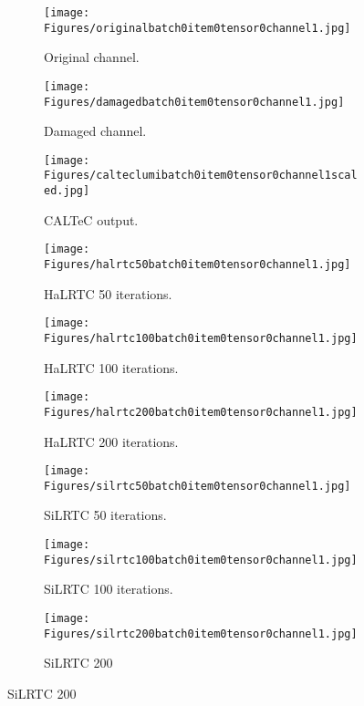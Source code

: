 \begin{figure}[H]
\centering
\begin{subfigure}{.32\linewidth}
	\centering
	\texttt{[image: Figures/originalbatch0item0tensor0channel1.jpg]}
	\caption{Original channel.}
\end{subfigure}%
\hfill
\begin{subfigure}{.32\textwidth}
	\centering
	\texttt{[image: Figures/damagedbatch0item0tensor0channel1.jpg]}
	\caption{Damaged channel.}
\end{subfigure}
\hfill 
%
\begin{subfigure}{.32\textwidth}
	\centering
	\texttt{[image: Figures/calteclumibatch0item0tensor0channel1scaled.jpg]}
	\caption{CALTeC output.}
\end{subfigure}

\begin{subfigure}{.32\textwidth}
	\centering
	\texttt{[image: Figures/halrtc50batch0item0tensor0channel1.jpg]}
	\caption{HaLRTC 50 iterations.}
\end{subfigure}
\hfill 
\begin{subfigure}{.32\textwidth}
	\centering
	\texttt{[image: Figures/halrtc100batch0item0tensor0channel1.jpg]}
	\caption{HaLRTC 100 iterations.}
\end{subfigure}
\hfill
\begin{subfigure}{.32\textwidth}
	\centering
	\texttt{[image: Figures/halrtc200batch0item0tensor0channel1.jpg]}
	\caption{HaLRTC 200 iterations.}
\end{subfigure}

\begin{subfigure}{.32\textwidth}
	\centering
	\texttt{[image: Figures/silrtc50batch0item0tensor0channel1.jpg]}
	\caption{SiLRTC 50 iterations.}
\end{subfigure}
\hfill 
\begin{subfigure}{.32\textwidth}
	\centering
	\texttt{[image: Figures/silrtc100batch0item0tensor0channel1.jpg]}
	\caption{SiLRTC 100 iterations.}
\end{subfigure}
\hfill
\begin{subfigure}{.32\textwidth}
	\centering
	\texttt{[image: Figures/silrtc200batch0item0tensor0channel1.jpg]}
	\caption{SiLRTC 200}
\end{subfigure}


\end{figure}
